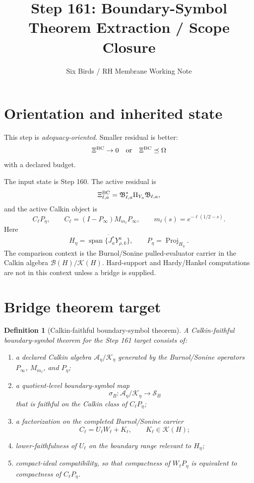 \documentclass[11pt]{article}
\title{Step 161: Boundary-Symbol Theorem Extraction / Scope Closure}
\author{Six Birds / RH Membrane Working Note}
\date{}
\newtheorem{definition}{Definition}
\begin{document}
\maketitle

\section{Orientation and inherited state}

This step is \emph{adequacy-oriented}.  Smaller residual is better:
\[
  \Xi^{\rm BC}\to 0
  \quad\text{or}\quad
  \Xi^{\rm BC}\preceq \Omega
\]
with a declared budget.

The input state is Step 160.  The active residual is
\[
  \Xi^{\rm BC}_{\ell,a}
  =
  \mathfrak B_{\ell,a}^{*}\Pi_{Y_a}\mathfrak B_{\ell,a},
\]
and the active Calkin object is
\[
  C_\ell P_\eta,
  \qquad
  C_\ell=(I-P_\infty)M_{m_\ell}P_\infty,
  \qquad
  m_\ell(s)=e^{-\ell(1/2-s)}.
\]
Here
\[
  H_\eta=
  \overline{\operatorname{span}\{J_a^*Y^a_{\rho,k}\}},
  \qquad
  P_\eta=\operatorname{Proj}_{H_\eta}.
\]
The comparison context is the Burnol/Sonine pulled-evaluator carrier in the
Calkin algebra \(\mathcal B(H)/\mathcal K(H)\).  Hard-support and
Hardy/Hankel computations are not in this context unless a bridge is supplied.

\section{Bridge theorem target}

\begin{definition}[Calkin-faithful boundary-symbol theorem]
A Calkin-faithful boundary-symbol theorem for the Step 161 target consists of:
\begin{enumerate}[label=(\roman*)]
  \item a declared Calkin algebra \(\mathcal A_\eta/\mathcal K_\eta\) generated
  by the Burnol/Sonine operators \(P_\infty\), \(M_{m_\ell}\), and \(P_\eta\);
  \item a quotient-level boundary-symbol map
  \[
    \sigma_B:\mathcal A_\eta/\mathcal K_\eta\to\mathcal S_B
  \]
  that is faithful on the Calkin class of \(C_\ell P_\eta\);
  \item a factorization on the completed Burnol/Sonine carrier
  \[
    C_\ell=U_\ell W_\ell+K_\ell,
    \qquad
    K_\ell\in\mathcal K(H);
  \]
  \item lower-faithfulness of \(U_\ell\) on the boundary range relevant to
  \(H_\eta\);
  \item compact-ideal compatibility, so that compactness of \(W_\ell P_\eta\)
  is equivalent to compactness of \(C_\ell P_\eta\).
\end{enumerate}
\end{definition}
\end{document}
